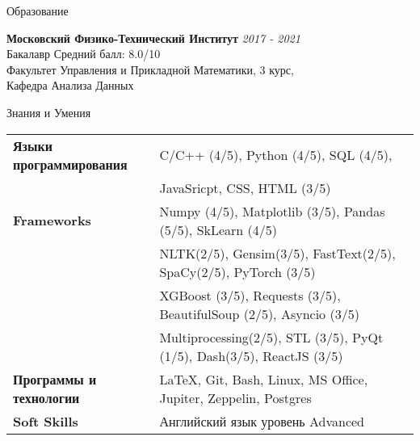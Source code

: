 \documentclass{resume} %
\begin{document}

\begin{rSection}{Образование}

{\bf Московский Физико-Технический Институт} \hfill {\em 2017 - 2021} 
\\ Бакалавр \hfill { Средний балл: 8.0/10}
\\ Факультет Управления и Прикладной Математики, 3 курс, \\Кафедра Анализа Данных


\end{rSection}

\begin{rSection}{Знания и Умения}

\begin{tabular}{ @{} >{\bfseries}l @{\hspace{6ex}} l }
Языки программирования &  C/C++ (4/5), Python (4/5),  SQL  (4/5),  \\																				   &JavaSricpt, CSS, HTML (3/5) \\
Frameworks & Numpy (4/5), Matplotlib (3/5), Pandas (5/5), SkLearn (4/5)\\ 
					& NLTK(2/5), Gensim(3/5), FastText(2/5), SpaCy(2/5), PyTorch (3/5)\\ 
					& XGBoost (3/5), Requests (3/5), BeautifulSoup (2/5), Asyncio (3/5)\\
					& Multiprocessing(2/5), STL (3/5), PyQt (1/5), Dash(3/5), ReactJS (3/5)\\
Программы и технологии & LaTeX, Git, Bash, Linux, MS Office, Jupiter, Zeppelin, Postgres \\
Soft Skills & Английский язык уровень Advanced
\end{tabular}

\end{rSection}

\end{document}

